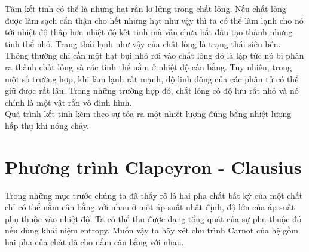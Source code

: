Tâm kết tinh có thể là những hạt rắn lơ lửng trong chất lỏng. Nếu chất lỏng được làm sạch cẩn thận cho hết những hạt như vậy thì ta có thể làm lạnh cho nó tới nhiệt độ thấp hơn nhiệt độ kết tinh mà vẫn chưa bắt đầu tạo thành những tinh thể nhỏ. Trạng thái lạnh như vậy của chất lỏng là trạng thái siêu bền. Thông thường chỉ cần một hạt bụi nhỏ rơi vào chất lỏng đó là lập tức nó bị phân ra thành chất lỏng và các tinh thể nằm ở nhiệt độ cân bằng. Tuy nhiên, trong một số trường hợp, khi làm lạnh rất mạnh, độ linh động của các phân tử có thể giữ được rất lâu. Trong những trường hợp đó, chất lỏng có độ lưu rất nhỏ và nó chính là một vật rắn vô định hình.\\

Quá trình kết tinh kèm theo sự tỏa ra một nhiệt lượng đúng bằng nhiệt lượng hấp thụ khi nóng chảy.


\section{Phương trình Clapeyron - Clausius}\label{sec:15_7}

Trong những mục trước chúng ta đã thấy rõ là hai pha chất bất kỳ của một chất chỉ có thể nằm cân bằng với nhau ở một áp suất nhất định, độ lớn của áp suất phụ thuộc vào nhiệt độ. Ta có thể thu được dạng tổng quát của sự phụ thuộc đó nếu dùng khái niệm entropy. Muốn vậy ta hãy xét chu trình Carnot của hệ gồm hai pha của chất đã cho nằm cân bằng với nhau.\\

